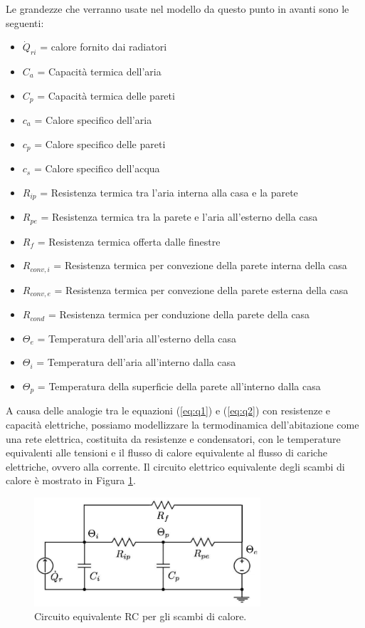 \documentclass[laurea,oneside,11pt]{USiena_tesiLM}
\begin{document}
Le grandezze che verranno usate nel modello da questo punto in avanti sono le seguenti:
\begin{itemize}
\item[] $\dot{Q}_{ri}$ = calore fornito dai radiatori
\item[]$C_a$ = Capacità termica dell'aria 
\item[]$C_p$ = Capacità termica delle pareti
\item[]$c_a$ = Calore specifico dell'aria 
\item[]$c_p$ = Calore specifico delle pareti
\item[]$c_s$ = Calore specifico dell'acqua
\item[]$R_{ip}$ = Resistenza termica tra l'aria interna alla casa e la parete 
\item[]$R_{pe}$ = Resistenza termica tra la parete e l'aria all'esterno della casa
\item[]$R_{f}$ = Resistenza termica offerta dalle finestre 
\item[]$R_{conv,i}$ = Resistenza termica per convezione della  parete interna della casa
\item[]$R_{conv,e}$ = Resistenza termica per convezione della  parete esterna della casa
\item[]$R_{cond}$ = Resistenza termica per conduzione della parete della casa
\item[]$\Theta_{e}$ = Temperatura dell'aria all'esterno della casa
\item[]$\Theta_i$ = Temperatura dell'aria all'interno dalla casa
\item[]$\Theta_p$ = Temperatura della superficie della parete all'interno dalla casa 
\end{itemize}


A causa delle analogie tra le equazioni (\ref{eq:q1}) e (\ref{eq:q2}) con resistenze e capacità elettriche, possiamo modellizzare la termodinamica dell'abitazione come una rete elettrica, costituita da resistenze e condensatori, con le temperature equivalenti alle tensioni e il flusso di calore equivalente al flusso di cariche elettriche, ovvero alla corrente. Il circuito elettrico equivalente degli scambi di calore è mostrato in Figura \ref{fig:RC}.

\begin{figure}[h]
\begin{center}
\includegraphics[width=0.75\textwidth]{figure/schema_trasf_calore}
\caption{Circuito equivalente RC per gli scambi di calore.}
\label{fig:RC}
\end{center}
\end{figure}
 
\end{document}
